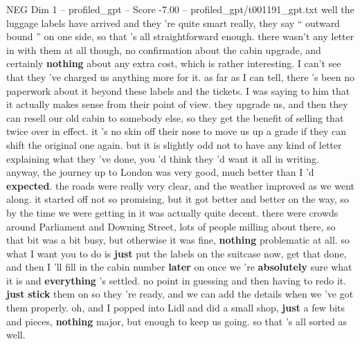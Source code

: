 \begin{textsample}{NEG Dim 1 – profiled\_gpt – Score -7.00 – profiled\_gpt/t001191\_gpt.txt}  \label{ex:f1_neg_013}
well the luggage labels have arrived and they ’re quite smart really, they say “ outward bound ” on one side, so that ’s all straightforward enough. there wasn't any letter in with them at all though, no confirmation about the cabin upgrade, and certainly \textbf{nothing} about any extra cost, which is rather interesting.
I can't see that they ’ve charged us anything more for it. as far as I can tell, there ’s been no paperwork about it beyond these labels and the tickets.
I was saying to him that it actually makes sense from their point of view. they upgrade us, and then they can resell our old cabin to somebody else, so they get the benefit of selling that twice over in effect. it ’s no skin off their nose to move us up a grade if they can shift the original one again. but it is slightly odd not to have any kind of letter explaining what they ’ve done, you ’d think they ’d want it all in writing. anyway, the journey up to London was very good, much better than I ’d \textbf{expected}. the roads were really very clear, and the weather improved as we went along. it started off not so promising, but it got better and better on the way, so by the time we were getting in it was actually quite decent. there were crowds around Parliament and Downing Street, lots of people milling about there, so that bit was a bit busy, but otherwise it was fine, \textbf{nothing} problematic at all. so what I want you to do is \textbf{just} put the labels on the suitcase now, get that done, and then I ’ll fill in the cabin number \textbf{later} on once we ’re \textbf{absolutely} sure what it is and \textbf{everything} ’s settled. no point in guessing and then having to redo it. \textbf{just} \textbf{stick} them on so they ’re ready, and we can add the details when we ’ve got them properly. oh, and I popped into Lidl and did a small shop, \textbf{just} a few bits and pieces, \textbf{nothing} major, but enough to keep us going. so that ’s all sorted as well.

\end{textsample}
